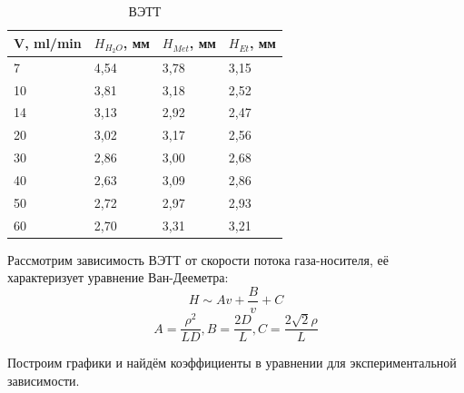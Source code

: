 \documentclass{article}
\begin{document}
\begin{table}[h]
\centering
\begin{tabular}{|l|l|l|l|}
\hline
V, ml/min & $H_{H_2O}$, мм     & $H_{Met}$, мм     & $H_{Et}$, мм      \\ \hline
7            & 4,54 & 3,78 & 3,15 \\ \hline
10           & 3,81 & 3,18 & 2,52 \\ \hline
14           & 3,13 & 2,92 & 2,47 \\ \hline
20           & 3,02 & 3,17 & 2,56 \\ \hline
30           & 2,86 & 3,00 & 2,68 \\ \hline
40           & 2,63 & 3,09 & 2,86 \\ \hline
50           & 2,72 & 2,97 & 2,93 \\ \hline
60           & 2,70 & 3,31 & 3,21 \\ \hline
\end{tabular}
\caption{ВЭТТ}
\label{tab:ВЭТТ}
\end{table}

\par Рассмотрим зависимость ВЭТТ от скорости потока газа-носителя, её характеризует уравнение Ван-Дееметра:
$$ H \sim  Av+\frac{B}{v} + C$$
$$ A = \frac{\rho^2}{LD}, B = \frac{2D}{L}, C = \frac{2\sqrt{2}\rho}{L}$$
\par Построим графики и найдём коэффициенты в уравнении для экспериментальной зависимости.
\end{document}
